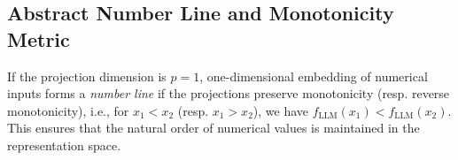 
\subsection{Abstract Number Line and Monotonicity Metric}  
If the projection dimension is $p=1$, one-dimensional embedding of numerical inputs forms a \emph{number line} if the projections preserve monotonicity (resp. reverse monotonicity), i.e., for \( x_1 < x_2 \) (resp. $x_1>x_2$), we have  
$
f_{\text{LLM}}(x_1) < f_{\text{LLM}}(x_2).
$
This ensures that the natural order of numerical values is maintained in the representation space.  



